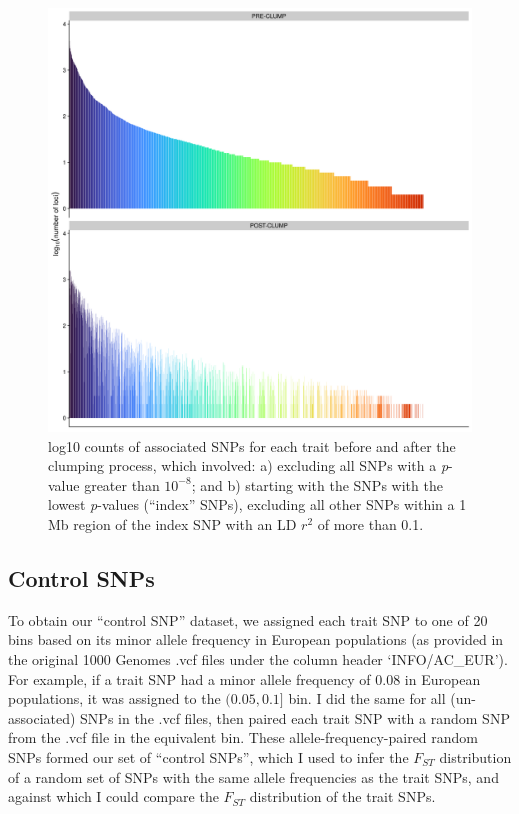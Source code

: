 \documentclass[
]{book}
\begin{document}
\begin{figure}
\includegraphics[width=1\linewidth]{figs/fst/0.1_1000_20220314_snp_counts} \caption{log10 counts of associated SNPs for each trait before and after the clumping process, which involved: a) excluding all SNPs with a \emph{p}-value greater than \(10^{-8}\); and b) starting with the SNPs with the lowest \emph{p}-values (``index'' SNPs), excluding all other SNPs within a 1 Mb region of the index SNP with an LD \(r^2\) of more than 0.1.}\label{fig:FstSnpCount}
\end{figure}

\hypertarget{control-snps}{%
\subsection{Control SNPs}\label{control-snps}}

To obtain our ``control SNP'' dataset, we assigned each trait SNP to one of 20 bins based on its minor allele frequency in European populations (as provided in the original 1000 Genomes .vcf files under the column header `INFO/AC\_EUR'). For example, if a trait SNP had a minor allele frequency of 0.08 in European populations, it was assigned to the \((0.05, 0.1]\) bin. I did the same for all (un-associated) SNPs in the .vcf files, then paired each trait SNP with a random SNP from the .vcf file in the equivalent bin. These allele-frequency-paired random SNPs formed our set of ``control SNPs'', which I used to infer the \(F_{ST}\) distribution of a random set of SNPs with the same allele frequencies as the trait SNPs, and against which I could compare the \(F_{ST}\) distribution of the trait SNPs.
\end{document}
